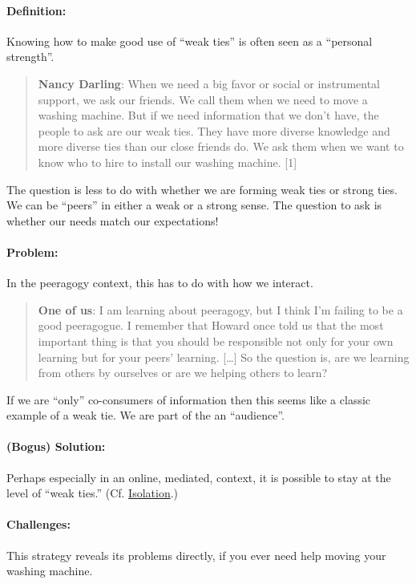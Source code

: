 \paragraph{Definition:} Knowing how to make good use of ``weak ties'' is
often seen as a ``personal strength''.

\begin{quote}
\textbf{Nancy Darling}:  When we need a big favor or social or
instrumental support, we ask our friends. We call them when we need to
move a washing machine. But if we need information that we don't have,
the people to ask are our weak ties. They have more diverse knowledge
and more diverse ties than our close friends do. We ask them when we
want to know who to hire to install our washing machine. {[}1{]}
\end{quote}

The question is less to do with whether we are forming weak ties or
strong ties. We can be ``peers'' in either a weak or a strong sense. The
question to ask is whether our needs match our expectations!

\paragraph{Problem:} In the peeragogy context, this has to do with how we
interact.

\begin{quote}
\textbf{One of us}: I am learning about peeragogy, but I think I'm
failing to be a good peeragogue. I remember that Howard once told us
that the most important thing is that you should be responsible not only
for your own learning but for your peers' learning. {[}\ldots{}{]} So
the question is, are we learning from others by ourselves or are we
helping others to learn?
\end{quote}

If we are ``only'' co-consumers of information then this seems like a
classic example of a weak tie. We are part of the an ``audience''.

\paragraph{(Bogus) Solution:} Perhaps especially in an online, mediated, context,
it is possible to stay at the level of ``weak ties.''
(Cf. \href{http://peeragogy.org/antipatterns/isolation/}{Isolation}.)

\paragraph{Challenges:} This strategy reveals its problems directly, if you
ever need help moving your washing machine.

